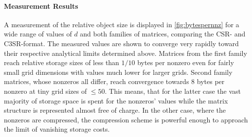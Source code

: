    \begin{center}
    \end{center}

    \paragraph{Measurement Results}

    A measurement of the relative object size is displayed in \ref{fig:bytespernnz} for a wide range of values of $d$
    and both families of matrices, comparing the CSR- and C3SR-format. The measured values are shown to converge very
    rapidly toward their respective analytical limits determined above. Matrices from the first family reach relative
    storage sizes of less than $1/10$ bytes per nonzero even for fairly small grid dimensions with values much lower for
    larger grids. Second family matrices, whose nonzeros all differ, reach convergence towards $8$ bytes per nonzero
    at tiny grid sizes of $\leq 50$. This means, that for the latter case the vast majority of storage space is spent
    for the nonzeros' values while the matrix structure is represented almost free of charge. In the other case, where
    the nonzeros are compressed, the compression scheme is powerful enough to approach the limit of vanishing storage
    costs.

